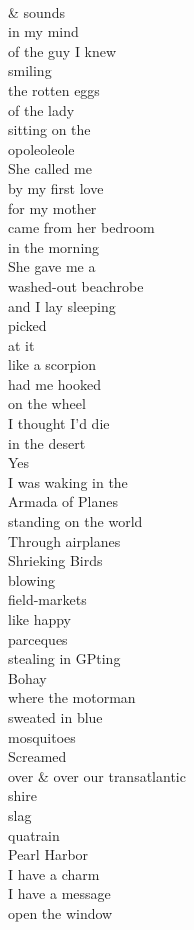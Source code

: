 \documentclass[smalldemyvopaper,11pt,twoside,onecolumn,openright,extrafontsizes]{memoir}
\begin{document}
\\\& sounds
\\in my mind
\\of the guy I knew
\\smiling
\\the rotten eggs
\\of the lady
\\sitting on the
\\opoleoleole
\\She called me
\\by my first love
\\for my mother
\\came from her bedroom
\\in the morning
\\She gave me a
\\washed-out beachrobe
\\and I lay sleeping
\\picked
\\at it
\\like a scorpion
\\had me hooked
\\on the wheel
\\I thought I'd die
\\in the desert
\\Yes
\\I was waking in the
\\Armada of Planes
\\standing on the world
\\Through airplanes
\\Shrieking Birds
\\blowing
\\field-markets
\\like happy
\\parceques
\\stealing in GPting
\\Bohay
\\where the motorman
\\sweated in blue
\\mosquitoes
\\Screamed
\\over \& over our transatlantic
\\shire
\\slag
\\quatrain
\\Pearl Harbor
\\I have a charm
\\I have a message
\\open the window
\end{document}
